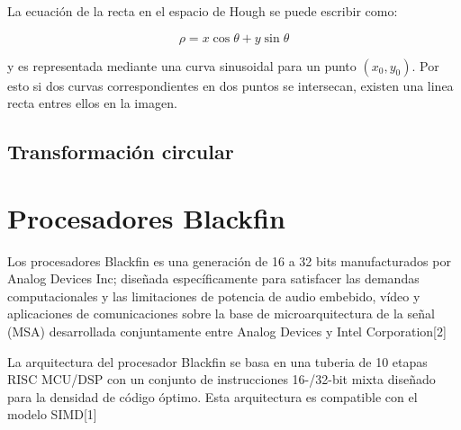 %


La ecuación de la recta en el espacio de Hough se puede escribir como:

\begin{equation}
\rho = x\cos\theta + y\sin\theta
\end{equation}

y es representada mediante una curva sinusoidal para un punto $(x_{0},y_{0})$. Por esto si dos curvas correspondientes en dos puntos se intersecan, existen una linea recta entres ellos en la imagen.  

\subsection{Transformación circular}


\section{Procesadores Blackfin}

Los procesadores Blackfin es una generación de 16 a 32 bits manufacturados por Analog Devices Inc; diseñada específicamente para satisfacer las demandas computacionales y las limitaciones de potencia de audio embebido, vídeo y aplicaciones de comunicaciones sobre la base de microarquitectura de la señal (MSA) desarrollada conjuntamente entre Analog Devices y Intel Corporation[2] 

La arquitectura del procesador Blackfin se basa en una tuberia de 10 etapas RISC MCU/DSP con un conjunto de instrucciones 16-/32-bit mixta diseñado para la densidad de código óptimo. Esta arquitectura es compatible con el modelo SIMD[1] 





